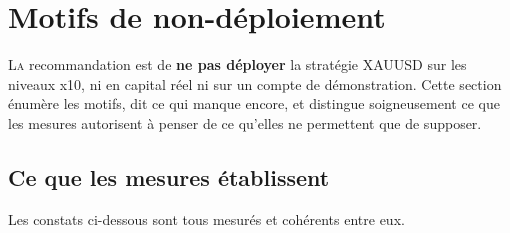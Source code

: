 \section{Motifs de non-déploiement}
\label{sec:x10_non_deploiement}

\lettrine[lines=2, findent=2pt, nindent=0pt]{L}{a} recommandation est de
\textbf{ne pas déployer} la stratégie XAUUSD sur les niveaux x10, ni en
capital réel ni sur un compte de démonstration. Cette section énumère les
motifs, dit ce qui manque encore, et distingue soigneusement ce que les
mesures autorisent à penser de ce qu'elles ne permettent que de supposer.

\subsection{Ce que les mesures établissent}

Les constats ci-dessous sont tous mesurés et cohérents entre eux.

